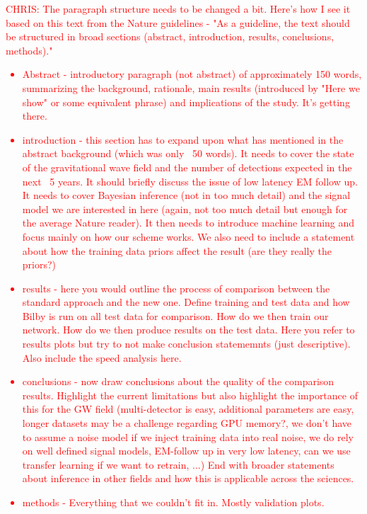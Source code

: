 \documentclass[%
showpacs,
 amsmath,amssymb,
 aps,
 twocolumn,
 prl,
 reprint,
floatfix,
]{revtex4-1}
\newcommand{\chris}[1]{\textcolor{red}{CHRIS: #1}}
\begin{document}
\chris{
The paragraph structure needs to be changed a bit. Here's how I see it based on
this text from the Nature guidelines - "As a guideline, the text should be
structured in broad sections (abstract, introduction, results, conclusions,
methods)." 
\begin{itemize} 
%
\item Abstract - introductory paragraph
(not abstract) of approximately 150 words, summarizing the background,
rationale, main results (introduced by "Here we show" or some equivalent
phrase) and implications of the study. It's getting there.  
%
\item introduction - this section has to expand upon what has mentioned in the
abstract background (which was only ~50 words). It needs to cover the state of
the gravitational wave field and the number of detections expected in the next
~5 years. It should briefly discuss the issue of low latency EM follow up. It
needs to cover Bayesian inference (not in too much detail) and the signal model
we are interested in here (again, not too much detail but enough for the
average Nature reader). It then needs to introduce machine learning and focus
mainly on how our scheme works. We also need to include a statement about how
the training data priors affect the result (are they really the priors?)   
%
\item results - here you would outline the process of comparison between the
standard approach and the new one. Define training and test data and how Bilby
is run on all test data for comparison. How do we then train our network. How
do we then produce results on the test data. Here you refer to results plots
but try to not make conclusion statememnts (just descriptive). Also include the
speed analysis here.  
%
\item conclusions - now draw conclusions about the quality of the comparison
results. Highlight the current limitations but also highlight the importance of
this for the GW field (multi-detector is easy, additional parameters are easy,
longer datasets may be a challenge regarding GPU memory?, we don't have to
assume a noise model if we inject training data into real noise, we do rely on
well defined signal models, EM-follow up in very low latency, can we use
transfer learning if we want to retrain, ...) End with broader statements about
inference in other fields and how this is applicable across the sciences.
%
\item methods - Everything that we couldn't fit in. Mostly validation plots.
%
\end{itemize} }
\end{document}

